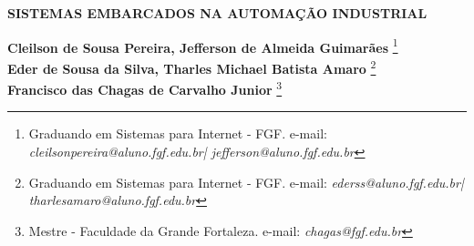 \documentclass[12pt]{article}
\begin{document}

%



\begin{center}
\textbf{\Large{SISTEMAS EMBARCADOS NA AUTOMAÇÃO INDUSTRIAL}}\\
\end{center}

\vspace*{0.2cm}

\begin{flushright}
 {\bf Cleilson de Sousa Pereira, Jefferson de Almeida Guimarães} \footnote[1]{Graduando em Sistemas para Internet - FGF. e-mail: \it cleilsonpereira@aluno.fgf.edu.br\hbox      | jefferson@aluno.fgf.edu.br}  \\
  {\bf Eder de Sousa da Silva, Tharles Michael Batista Amaro} \footnote[2]{Graduando em Sistemas para Internet - FGF. e-mail: \it ederss@aluno.fgf.edu.br\hbox |
  tharlesamaro@aluno.fgf.edu.br}  \\
  {\bf Francisco das Chagas de Carvalho Junior} \footnote[3]{Mestre - Faculdade da Grande Fortaleza. e-mail: \it chagas@fgf.edu.br}   \\
\end{flushright}

\vspace*{0.5cm}

\end{document}
